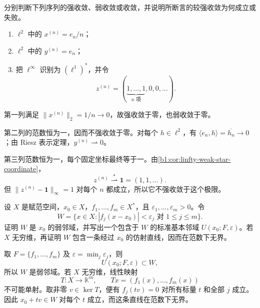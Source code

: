 \begin{exercise}\label{b1:ex:09-basic-convergence}
分别判断下列序列的强收敛、弱收敛或\WeakStar{}收敛，并说明所断言的较强收敛为何成立或失败。
\begin{enumerate}
\item \(\ell^2\) 中的 \(x^{(n)}=e_n/n\)；
\item \(\ell^2\) 中的 \(y^{(n)}=e_n\)；
\item 把 \(\ell^\infty\) 识别为 \((\ell^1)^*\)，并令
\[
 z^{(n)}=(\underbrace{1,\ldots,1}_{n\text{ 项}},0,0,\ldots).
\]
\end{enumerate}
\end{exercise}
\begin{solution}
第一列满足 \(\|x^{(n)}\|_2=1/n\to0\)，故强收敛于零，也弱收敛于零。

第二列的范数恒为一，因而不强收敛于零。对每个 \(h\in\ell^2\)，有
\(\langle e_n,h\rangle=\overline{h_n}\to0\)；由 Riesz 表示定理，\(y^{(n)}\rightharpoonup0\)。

第三列范数恒为一，每个固定坐标最终等于一。由\cref{b1:cor:linfty-weak-star-coordinate}，
\[
 z^{(n)}\overset{*}{\rightharpoonup}\mathbf 1=(1,1,\ldots).
\]
但 \(\|z^{(n)}-\mathbf1\|_\infty=1\) 对每个 \(n\) 都成立，所以它不强收敛于这个\WeakStar{}极限。
\end{solution}

\begin{exercise}\label{b1:ex:09-basic-weak-neighborhood}
设 \(X\) 是赋范空间，\(x_0\in X\)，\(f_1,\ldots,f_m\in X^*\)，且 \(\varepsilon_1,\ldots,\varepsilon_m>0\)。令
\[
 W=\{x\in X:|f_j(x-x_0)|<\varepsilon_j\text{ 对 }1\leq j\leq m\}.
\]
证明 \(W\) 是 \(x_0\) 的弱邻域，并写出一个包含于 \(W\) 的标准基本邻域 \(U(x_0;F,\varepsilon)\)。若 \(X\) 无穷维，再证明 \(W\) 包含一条经过 \(x_0\) 的仿射直线，因而在范数下无界。
\end{exercise}
\begin{solution}
取 \(F=\{f_1,\ldots,f_m\}\) 及 \(\varepsilon=\min_j\varepsilon_j\)，则
\[
 U(x_0;F,\varepsilon)\subset W,
\]
所以 \(W\) 是弱邻域。若 \(X\) 无穷维，线性映射
\[
 T:X\to\mathbb K^m,\qquad Tx=(f_1(x),\ldots,f_m(x))
\]
不可能单射。取非零 \(v\in\ker T\)，便有 \(f_j(tv)=0\) 对所有标量 \(t\) 和全部 \(j\) 成立。因此 \(x_0+tv\in W\) 对每个 \(t\) 成立，而这条直线在范数下无界。
\end{solution}

